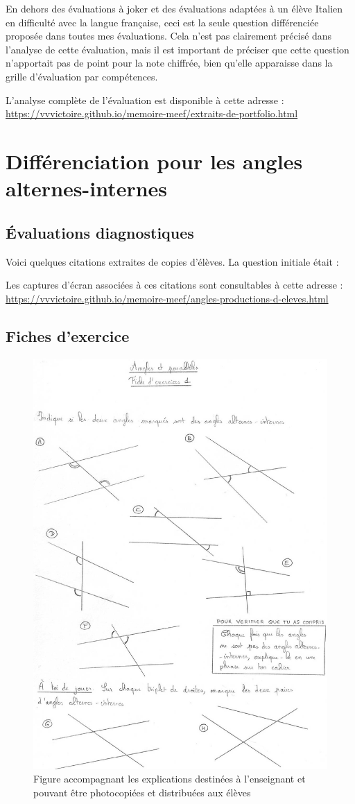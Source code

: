 En dehors des évaluations à joker et des évaluations adaptées à un élève Italien en difficulté avec la langue française, ceci est la seule question différenciée proposée dans toutes mes évaluations. Cela n'est pas clairement précisé dans l'analyse de cette évaluation, mais il est important de préciser que cette question n'apportait pas de point pour la note chiffrée, bien qu'elle apparaisse dans la grille d'évaluation par compétences.

L'analyse complète de l'évaluation est disponible à cette adresse : \url{https://vvvictoire.github.io/memoire-meef/extraits-de-portfolio.html}

\clearpage

\section{Différenciation pour les angles alternes-internes}

\subsection{Évaluations diagnostiques}\label{annexe:angles-prod1}

Voici quelques citations extraites de copies d'élèves. La question initiale était : 

Les captures d'écran associées à ces citations sont consultables à cette adresse : \url{https://vvvictoire.github.io/memoire-meef/angles-productions-d-eleves.html}

\subsection{Fiches d'exercice}\label{annexe:angles-fiches}

\begin{figure}[h!]
    \centering
    \includegraphics[width=0.6\linewidth]{img/anglesfiche1.jpg}
    \caption{Figure accompagnant les explications destinées à l'enseignant et pouvant être photocopiées et distribuées aux élèves}
    \label{fig:angles-fiche1}
\end{figure}

